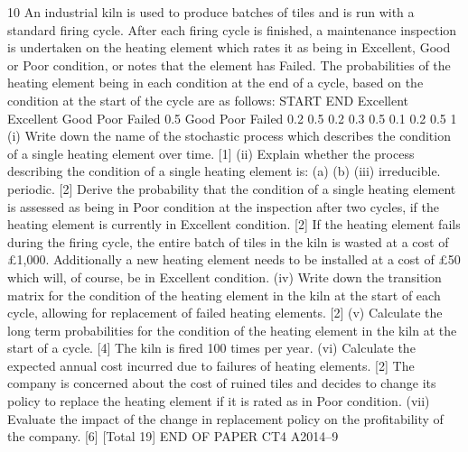 \documentclass[a4paper,12pt]{article}
\begin{document}
\begin{enumerate}
10
An industrial kiln is used to produce batches of tiles and is run with a standard firing
cycle. After each firing cycle is finished, a maintenance inspection is undertaken on
the heating element which rates it as being in Excellent, Good or Poor condition, or
notes that the element has Failed.
The probabilities of the heating element being in each condition at the end of a cycle,
based on the condition at the start of the cycle are as follows:
START
END
Excellent
Excellent
Good
Poor
Failed
0.5
Good Poor Failed
0.2
0.5 0.2
0.3
0.5 0.1
0.2
0.5
1
(i) Write down the name of the stochastic process which describes the condition
of a single heating element over time.
[1]
(ii) Explain whether the process describing the condition of a single heating
element is:
(a)
(b)
(iii)
irreducible.
periodic.
[2]
Derive the probability that the condition of a single heating element is
assessed as being in Poor condition at the inspection after two cycles, if the
heating element is currently in Excellent condition.
[2]
If the heating element fails during the firing cycle, the entire batch of tiles in the kiln
is wasted at a cost of £1,000. Additionally a new heating element needs to be
installed at a cost of £50 which will, of course, be in Excellent condition.
(iv) Write down the transition matrix for the condition of the heating element in
the kiln at the start of each cycle, allowing for replacement of failed heating
elements.
[2]
(v) Calculate the long term probabilities for the condition of the heating element
in the kiln at the start of a cycle.
[4]
The kiln is fired 100 times per year.
(vi)
Calculate the expected annual cost incurred due to failures of heating
elements.
[2]
The company is concerned about the cost of ruined tiles and decides to change its
policy to replace the heating element if it is rated as in Poor condition.
(vii)
Evaluate the impact of the change in replacement policy on the profitability of
the company.
[6]
[Total 19]
END OF PAPER
CT4 A2014–9



\end{enumerate}
\end{document}
